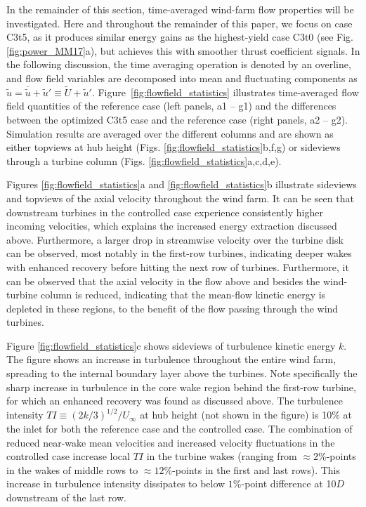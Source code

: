 \documentclass[wes, manuscript]{copernicus}
\newcommand{\revision}[1]{{\color{blue} #1}}
\begin{document}
In the remainder of this section, time-averaged wind-farm flow properties will be investigated. Here and throughout the remainder of this paper, we focus on case C3t5, as it produces similar energy gains as the highest-yield case C3t0 (see Fig. \ref{fig:power_MM17}a), but achieves this with smoother thrust coefficient signals. In the following discussion, the time averaging operation is denoted by an overline, and flow field variables are decomposed into mean and fluctuating components as $\widetilde{u} = \overline{\widetilde{u}} + \widetilde{u}' \equiv \widetilde{U} + \widetilde{u}'  $. Figure~\ref{fig:flowfield_statistics} illustrates time-averaged flow field quantities of the reference case (left panels, a1 -- g1) and the differences between the optimized C3t5 case and the reference case (right panels, a2 -- g2). Simulation results are averaged over the different columns and are shown as either topviews at hub height (Figs. \ref{fig:flowfield_statistics}b,f,g) or sideviews through a turbine column (Figs. \ref{fig:flowfield_statistics}a,c,d,e). 

Figures \ref{fig:flowfield_statistics}a and \ref{fig:flowfield_statistics}b illustrate sideviews and topviews of the axial velocity throughout the wind farm. It can be seen that downstream turbines in the controlled case experience consistently higher incoming velocities, which explains the increased energy extraction discussed above. Furthermore, a larger drop in streamwise velocity over the turbine disk can be observed, most notably in the first-row turbines, indicating deeper wakes with enhanced recovery before hitting the next row of turbines. Furthermore, it can be observed that the axial velocity in the flow above and besides the wind-turbine column is reduced, indicating that the mean-flow kinetic energy is depleted in these regions, to the benefit of the flow passing through the wind turbines. 

Figure \ref{fig:flowfield_statistics}c shows sideviews of turbulence kinetic energy $k$. The figure shows an increase in turbulence throughout the entire wind farm, spreading to the internal boundary layer above the turbines. Note specifically the sharp increase in turbulence in the core wake region behind the first-row turbine, for which an enhanced recovery was found as discussed above. \revision{The turbulence intensity $TI \equiv (2k/3  )^{1/2}/U_\infty$ at hub height (not shown in the figure) is 10\% at the inlet for both the reference case and the controlled case. The combination of reduced near-wake mean velocities and increased velocity fluctuations in the controlled case increase local $TI$ in the turbine wakes (ranging from $\approx 2$\%-points in the wakes of middle rows to $\approx 12$\%-points in the first and last rows). This increase in turbulence intensity dissipates to below $1$\%-point difference at 10$D$ downstream of the last row.}
\end{document}
